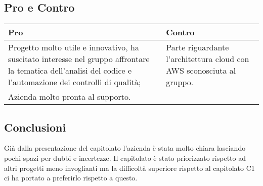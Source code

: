 \documentclass[a4paper,12pt]{article}
\begin{document}
{    \subsection*{Pro e Contro}{

        \begin{center} 
            \begin{tabular}{|p{9cm}|p{5cm}|}
                \hline
                \textbf{Pro} & \textbf{Contro} \\
                \hline
                Progetto molto utile e innovativo, ha suscitato interesse nel gruppo affrontare la tematica dell'analisi del codice e l'automazione dei controlli di qualità; & Parte riguardante 
                l'architettura cloud con AWS sconosciuta al gruppo.\\
                \hline
                Azienda molto pronta al supporto. & \\
                \hline
            \end{tabular}
        \end{center}

    }

    \subsection*{Conclusioni}{
        Già dalla presentazione del capitolato l'azienda è stata molto chiara lasciando pochi spazi per dubbi e incertezze. Il capitolato è stato priorizzato rispetto ad altri progetti meno invoglianti ma la difficoltà superiore rispetto al capitolato C1 ci ha portato a preferirlo rispetto a questo.
    }
}
\end{document}
